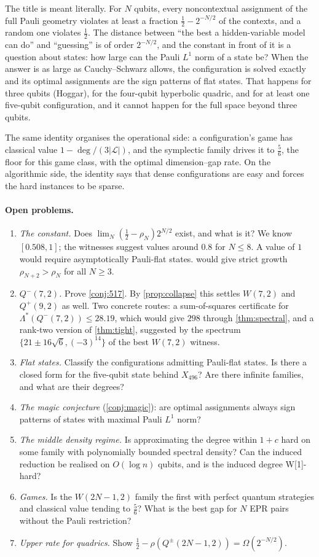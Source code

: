 \documentclass[a4paper,onecolumn,11pt,unpublished,nopdfoutputerror]{quantumarticle}
\theoremstyle{definition}
\renewcommand{\deg}{\operatorname{deg}}
\newcommand{\Lines}{\mathcal{L}}
\newcommand{\W}[1]{W(#1,2)}
\newcommand{\Qp}[1]{Q^{+}(#1,2)}
\newcommand{\Qm}[1]{Q^{-}(#1,2)}
\begin{document}
The title is meant literally. For $N$ qubits, every noncontextual assignment of the full Pauli geometry violates at
least a fraction $\tfrac12-2^{-N/2}$ of the contexts, and a random one violates $\tfrac12$. The distance between
``the best a hidden-variable model can do'' and ``guessing'' is of order $2^{-N/2}$, and the constant in front of
it is a question about states: how large can the Pauli $L^1$ norm of a state be? When the answer is as large as
Cauchy--Schwarz allows, the configuration is solved exactly and its optimal assignments are the sign patterns of
flat states. That happens for three qubits (Hoggar), for the four-qubit hyperbolic quadric, and for at least one
five-qubit configuration, and it cannot happen for the full space beyond three qubits.

The same identity organises the operational side: a configuration's game has classical value
$1-\deg/(3|\Lines|)$, and the symplectic family drives it to $\tfrac56$, the floor for this game class, with the
optimal dimension--gap rate. On the algorithmic side, the identity says that dense configurations are easy and
forces the hard instances to be sparse.

\paragraph{Open problems.}
\begin{enumerate}[leftmargin=*]
\item \emph{The constant.} Does $\lim_N(\tfrac12-\rho_N)2^{N/2}$ exist, and what is it? We know
$[0.508,1]$; the witnesses suggest values around $0.8$ for $N\le8$. A value of $1$ would require asymptotically
Pauli-flat states.  would give strict growth $\rho_{N+2}>\rho_N$ for all $N\ge3$.
\item \emph{$\Qm7$.} Prove \cref{conj:517}. By \cref{prop:collapse} this settles $\W7$ and $\Qp9$ as well. Two concrete
routes: a sum-of-squares certificate for $\Lambda^*(\Qm7)\le28.19$, which would give $298$ through
\cref{thm:spectral}, and a rank-two version of \cref{thm:tight}, suggested by the spectrum
$\{21\pm16\sqrt6,(-3)^{14}\}$ of the best $\W7$ witness.
\item \emph{Flat states.} Classify the configurations admitting Pauli-flat states. Is there a closed form for the
five-qubit state behind $X_{496}$? Are there infinite families, and what are their degrees?
\item \emph{The magic conjecture} (\cref{conj:magic}): are optimal assignments always sign patterns of states with
maximal Pauli $L^1$ norm?
\item \emph{The middle density regime.} Is approximating the degree within $1+c$ hard on some family with
polynomially bounded spectral density? Can the induced reduction be realised on $O(\log n)$ qubits, and is the
induced degree W[1]-hard?
\item \emph{Games.} Is the $\W{2N-1}$ family the first with perfect quantum strategies and classical value
tending to $\tfrac56$? What is the best gap for $N$ EPR pairs without the Pauli restriction?
\item \emph{Upper rate for quadrics.} Show $\tfrac12-\rho(Q^\pm(2N-1,2))=\Omega(2^{-N/2})$.
\end{enumerate}
\end{document}
